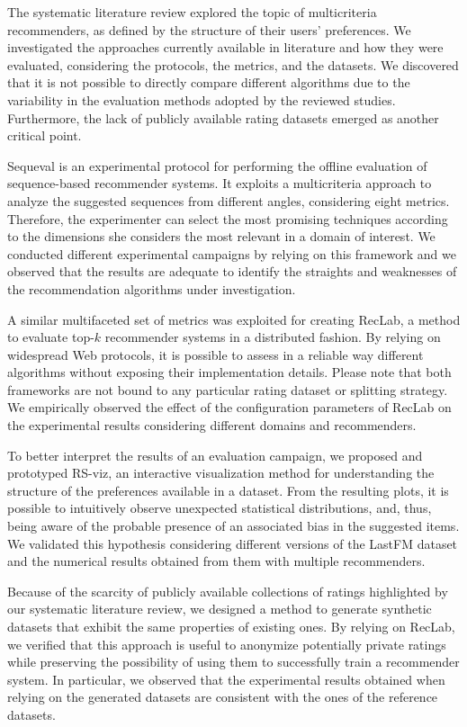 The systematic literature review explored the topic of multicriteria recommenders, as defined by the structure of their users' preferences. We investigated the approaches currently available in literature and how they were evaluated, considering the protocols, the metrics, and the datasets. We discovered that it is not possible to directly compare different algorithms due to the variability in the evaluation methods adopted by the reviewed studies. Furthermore, the lack of publicly available rating datasets emerged as another critical point.

Sequeval is an experimental protocol for performing the offline evaluation of sequence-based recommender systems. It exploits a multicriteria approach to analyze the suggested sequences from different angles, considering eight metrics. Therefore, the experimenter can select the most promising techniques according to the dimensions she considers the most relevant in a domain of interest. We conducted different experimental campaigns by relying on this framework and we observed that the results are adequate to identify the straights and weaknesses of the recommendation algorithms under investigation.

A similar multifaceted set of metrics was exploited for creating RecLab, a method to evaluate top-$k$ recommender systems in a distributed fashion. By relying on widespread Web protocols, it is possible to assess in a reliable way different algorithms without exposing their implementation details. Please note that both frameworks are not bound to any particular rating dataset or splitting strategy. We empirically observed the effect of the configuration parameters of RecLab on the experimental results considering different domains and recommenders.

To better interpret the results of an evaluation campaign, we proposed and prototyped RS-viz, an interactive visualization method for understanding the structure of the preferences available in a dataset. From the resulting plots, it is possible to intuitively observe unexpected statistical distributions, and, thus, being aware of the probable presence of an associated bias in the suggested items. We validated this hypothesis considering different versions of the LastFM dataset and the numerical results obtained from them with multiple recommenders.

Because of the scarcity of publicly available collections of ratings highlighted by our systematic literature review, we designed a method to generate synthetic datasets that exhibit the same properties of existing ones. By relying on RecLab, we verified that this approach is useful to anonymize potentially private ratings while preserving the possibility of using them to successfully train a recommender system. In particular, we observed that the experimental results obtained when relying on the generated datasets are consistent with the ones of the reference datasets.

